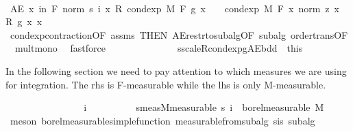 \begin{isabellebody}
\ \ \ \ \ \ \ \ \isamarkupfalse%
\ \isamarkupfalse%
\ {\isachardoublequoteopen}AE\ x\ in\ {\isacharquery}{\kern0pt}F{\isachardot}{\kern0pt}\ norm\ {\isacharparenleft}{\kern0pt}s\ i\ x\ {\isacharasterisk}{\kern0pt}\isactrlsub R\ cond{\isacharunderscore}{\kern0pt}exp\ M\ F\ g\ x{\isacharparenright}{\kern0pt}\ {\isasymle}\ {}\ {\isacharasterisk}{\kern0pt}\ cond{\isacharunderscore}{\kern0pt}exp\ M\ F\ {\isacharparenleft}{\kern0pt}{\isasymlambda}x{\isachardot}{\kern0pt}\ norm\ {\isacharparenleft}{\kern0pt}z\ x\ {\isacharasterisk}{\kern0pt}\isactrlsub R\ g\ x{\isacharparenright}{\kern0pt}{\isacharparenright}{\kern0pt}\ x{\isachardoublequoteclose}\ \isamarkupfalse%
\ cond{\isacharunderscore}{\kern0pt}exp{\isacharunderscore}{\kern0pt}contraction{\isacharbrackleft}{\kern0pt}OF\ assms{\isacharparenleft}{\kern0pt}{}{\isacharparenright}{\kern0pt}{\isacharcomma}{\kern0pt}\ THEN\ AE{\isacharunderscore}{\kern0pt}restr{\isacharunderscore}{\kern0pt}to{\isacharunderscore}{\kern0pt}subalg{}{\isacharbrackleft}{\kern0pt}OF\ subalg{\isacharbrackright}{\kern0pt}{\isacharbrackright}{\kern0pt}\ order{\isacharunderscore}{\kern0pt}trans{\isacharbrackleft}{\kern0pt}OF\ {\isacharunderscore}{\kern0pt}\ mult{\isacharunderscore}{\kern0pt}mono{\isacharbrackright}{\kern0pt}\ \isamarkupfalse%
\ fastforce\isanewline
\ \ \ \ \ \ \isacommand{{\isacharbraceright}{\kern0pt}}\isamarkupfalse%
\isanewline
\ \ \ \ \ \ \isamarkupfalse%
\ s{\isacharunderscore}{\kern0pt}scaleR{\isacharunderscore}{\kern0pt}cond{\isacharunderscore}{\kern0pt}exp{\isacharunderscore}{\kern0pt}g{\isacharunderscore}{\kern0pt}AE{\isacharunderscore}{\kern0pt}bdd\ {\isacharequal}{\kern0pt}\ this%
\begin{isamarkuptext}%
In the following section we need to pay attention to which measures we are using for integration. The rhs is F-measurable while the lhs is only M-measurable.%
\end{isamarkuptext}\isamarkuptrue%
\ \ \ \ \ \ \isacommand{{\isacharbraceleft}{\kern0pt}}\isamarkupfalse%
\isanewline
\ \ \ \ \ \ \ \ \isamarkupfalse%
\ i\isanewline
\ \ \ \ \ \ \ \ \isamarkupfalse%
\ s{\isacharunderscore}{\kern0pt}meas{\isacharunderscore}{\kern0pt}M{\isacharbrackleft}{\kern0pt}measurable{\isacharbrackright}{\kern0pt}{\isacharcolon}{\kern0pt}\ {\isachardoublequoteopen}s\ i\ {\isasymin}\ borel{\isacharunderscore}{\kern0pt}measurable\ M{\isachardoublequoteclose}\ \isamarkupfalse%
\ {\isacharparenleft}{\kern0pt}meson\ borel{\isacharunderscore}{\kern0pt}measurable{\isacharunderscore}{\kern0pt}simple{\isacharunderscore}{\kern0pt}function\ measurable{\isacharunderscore}{\kern0pt}from{\isacharunderscore}{\kern0pt}subalg\ s{\isacharunderscore}{\kern0pt}is{\isacharparenleft}{\kern0pt}{}{\isacharparenright}{\kern0pt}\ subalg{\isacharprime}{\kern0pt}{\isacharparenright}{\kern0pt}\isanewline

\end{isabellebody}

